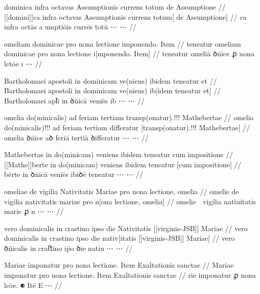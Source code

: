 \ex \bg
\gla
{}
dominica infra octavas Assumptionis currens totum de Assumptione 
//
\glRekonstrukcja
{}
[[domini]]ca infra octavas Assumptionis currens totum[ de Assumptione] 
//
\glU
{}
ca infra octās aumptiōis currēs totū ⋯ ⋯
//
\endgl
\xe


\ex \bg
\gla
{}
{} omeliam dominicae pro nona lectione imponendo.
Item 
//
\glRekonstrukcja
{}
teneatur   omeliam dominicae pro nona lectione i[mponendo.
Item]
//
\glU
{}
teneatur   omeliā ꝺn̄ice ꝓ nona lctōe ı ⋯
//
\endgl
\xe



\ex \bg
\gla
{}
Bartholomaei apostoli in dominicam ve(niens) ibidem teneatur et 
//
\glRekonstrukcja
{}
Bartholomaei apostoli in dominicam ve(niens) ib[idem teneatur et] 
//
\glU
{}
Bartholomaei apꝉi in ꝺn̈icā veniēs ib ⋯ ⋯
//
\endgl
\xe



\ex \bg
\gla
{}
omelia do(minicalis) ad feriam tertiam {} transp(onatur).!!!
Mathebertae
//
\glRekonstrukcja
{}
omelia do(minicalis)!!! ad feriam tertiam differatur [transp(onatur).!!!
Mathebertae]
//
\glU
{}
omelia ꝺn̄ice aꝺ feriā tertiā ꝺiﬀeratur ⋯ ⋯
//
\endgl
\xe



\ex \bg
\gla
{}
Mathebertae in do(minicam) veniens ibidem teneatur  cum impositione
//
\glRekonstrukcja
{}
[[Mathe]]berte in do(minicam) veniens ibidem teneatur  [cum impositione]
//
\glU
{}
bērte in ꝺn̄icā veniēs ibiꝺē teneatur  ⋯ ⋯
//
\endgl
\xe



\ex \bg
\gla
{}
omeliae de vigilia Nativitatis Mariae pro nona lectione, omelia
//
\glRekonstrukcja
{}
omelie de vigilia nativitatis mariae pro n[ona lectione, omelia]
//
\glU
{}
omelie  vigilia natiuitatis marie ꝓ n ⋯ ⋯
//
\endgl
\xe



\ex \bg
\gla
{}
vero dominicalis in crastino ipso die Nativitatis [[virginis-JSB]] Mariae
//
\glRekonstrukcja
{}
vero dominicalis in crastino ipso die nativ[itatis [[virginis-JSB]] Mariae]
//
\glU
{}
vero ꝺn̈icalis in craﬅino ip̄o ꝺie natiu ⋯ ⋯
//
\endgl
\xe



\ex \bg
\gla
{}
Mariae imponatur pro
nona lectione.
Item Exaltationis sanctae
//
\glRekonstrukcja
{}
Mariae imponatur pro
nona lectione.
Item Exaltationis sanctae
//
\glU
{}
rie imponatur ꝓ nona lcōe. ⁌ Itē E ⋯
//
\endgl
\xe



